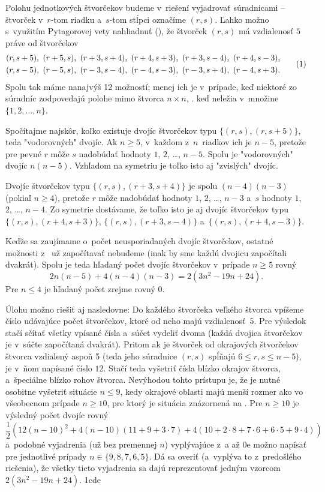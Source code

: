 ﻿{%
Polohu jednotkových štvorčekov budeme v~riešení vyjadrovať súradnicami -- štvorček v~$r$-tom riadku a~$s$-tom stĺpci označíme $(r,s)$.
Ľahko možno s~využitím Pytagorovej vety nahliadnuť (\obr), že štvorček $(r,s)$ má vzdialenosť $5$ práve od štvorčekov
$$
\gathered
(r,s+5),\ (r+5,s),\ (r+3,s+4),\ (r+4,s+3),\ (r+3,s-4),\ (r+4,s-3),\\
(r,s-5),\ (r-5,s),\ (r-3,s-4),\ (r-4,s-3),\ (r-3,s+4),\ (r-4,s+3).
\endgathered
\tag1
$$
Spolu tak máme nanajvýš 12 možností; menej ich je v~prípade, keď niektoré zo súradníc zodpovedajú polohe mimo štvorca $n\times n$, \tj. keď neležia v~množine $\{1,2,\dots,n\}$.
%

Spočítajme najskôr, koľko existuje dvojíc štvorčekov typu $\{(r,s),(r,s+5)\}$, teda "vodorovných" dvojíc. Ak $n\ge5$, v~každom z~$n$~riadkov ich je $n-5$, pretože pre pevné $r$ môže $s$ nadobúdať hodnoty $1$, $2$, \dots, $n-5$. Spolu je "vodorovných" dvojíc $n(n-5)$. Vzhľadom na symetriu je toľko isto aj "zvislých" dvojíc.

Dvojíc štvorčekov typu $\{(r,s),(r+3,s+4)\}$ je spolu $(n-4)(n-3)$ (pokiaľ $n\ge4$), pretože $r$ môže nadobúdať hodnoty $1$, $2$, \dots, $n-3$ a~$s$ hodnoty $1$, $2$, \dots, $n-4$. Zo symetrie dostávame, že toľko isto je aj dvojíc štvorčekov typu $\{(r,s),(r+4,s+3)\}$, $\{(r,s),(r+3,s-4)\}$ a~$\{(r,s),(r+4,s-3)\}$.

Keďže sa zaujímame o~počet neusporiadaných dvojíc štvorčekov, ostatné možnosti z~ už započítavať nebudeme (inak by sme každú dvojicu započítali dvakrát). Spolu je teda hľadaný počet dvojíc štvorčekov v~prípade $n\ge5$ rovný
$$
  2n(n-5)+4(n-4)(n-3)=2(3n^2-19n+24).
$$
Pre $n\le4$ je hľadaný počet zrejme rovný $0$.

\poznamka
Úlohu možno riešiť aj nasledovne: Do každého štvorčeka veľkého štvorca vpíšeme číslo udávajúce počet štvorčekov, ktoré od neho majú vzdialenosť~$5$. Pre výsledok stačí sčítať všetky vpísané čísla a~súčet vydeliť dvoma (každá dvojica štvorčekov je v~súčte započítaná dvakrát). Pritom ak je štvorček od okrajových štvorčekov štvorca vzdialený aspoň 5 (teda jeho súradnice $(r,s)$ spĺňajú $6\le r, s\le n-5$), je v~ňom napísané číslo $12$.
%
Stačí teda vyšetriť čísla blízko okrajov štvorca, a~špeciálne blízko rohov štvorca. Nevýhodou tohto prístupu je, že je nutné osobitne vyšetriť situácie $n\le9$, kedy okrajové oblasti majú menší rozmer ako vo všeobecnom prípade $n\ge 10$, pre ktorý je situácia znázornená na \obr. Pre $n\ge10$ je výsledný počet dvojíc rovný
$$
\frac12\left(12(n-10)^2+4(n-10)(11+9+3\cdot7)+4(10+2\cdot8+7\cdot6+6\cdot5+9\cdot4)\right)
$$
a~podobné vyjadrenia (už bez premennej $n$) vyplývajúce z~\obr{}a až \obrrnum0e možno napísať pre jednotlivé prípady $n\in\{9,8,7,6,5\}$. Dá sa overiť (a~vyplýva to z~predošlého riešenia), že všetky tieto vyjadrenia sa dajú reprezentovať jedným vzorcom $2(3n^2-19n+24)$.
%
1cde%

}
